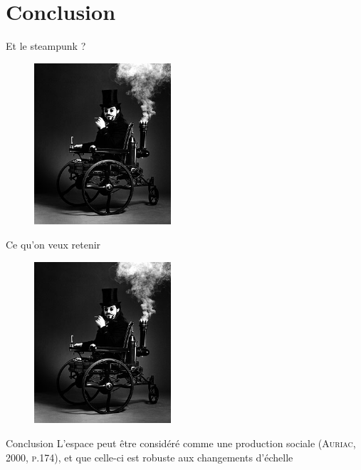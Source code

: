\documentclass[newPxFont]{beamer}
\begin{document}
%
%
\section{Conclusion}

\begin{frame}[c]{Et le steampunk ?}
  \vspace{-2em}

  \begin{figure}
   \includegraphics[height=6cm]{img/a_www.jpg}
  \end{figure}
\end{frame}

\begin{frame}[c]{Ce qu'on veux retenir}
  \vspace{-2em}

  \begin{figure}
   \includegraphics[height=6cm]{img/a_www.jpg}
  \end{figure}
\end{frame}
\begin{frame}[c]{Conclusion}
\vspace{-2em}
L'espace peut être considéré comme une production sociale (\textsc{Auriac, 2000, p.174}), et que celle-ci est robuste aux changements d'échelle
\end{frame}
\end{document}
